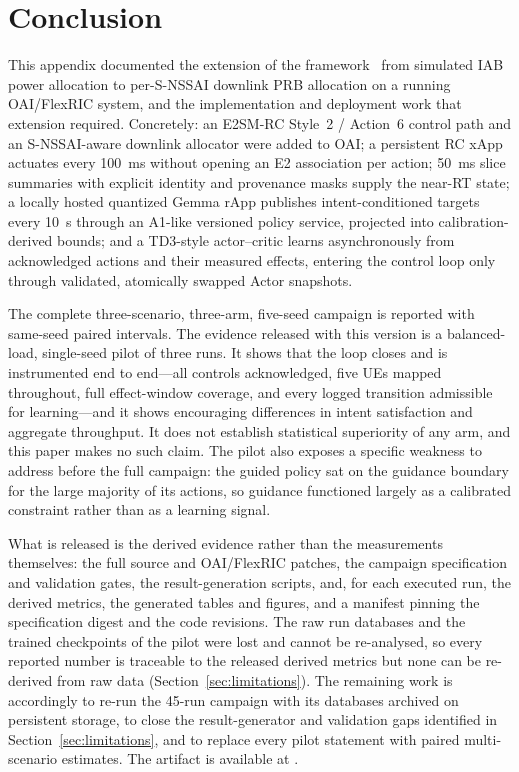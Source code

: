 \section{Conclusion}
This appendix documented the extension of the \systemname{} framework~\cite{bao2026llmhric} from simulated IAB power allocation to per-S-NSSAI downlink PRB allocation on a running OAI/FlexRIC system, and the implementation and deployment work that extension required. Concretely: an E2SM-RC Style~2 / Action~6 control path and an S-NSSAI-aware downlink allocator were added to OAI; a persistent RC xApp actuates every 100~ms without opening an E2 association per action; 50~ms slice summaries with explicit identity and provenance masks supply the near-RT state; a locally hosted quantized Gemma rApp publishes intent-conditioned targets every 10~s through an A1-like versioned policy service, projected into calibration-derived bounds; and a TD3-style actor--critic learns asynchronously from acknowledged actions and their measured effects, entering the control loop only through validated, atomically swapped Actor snapshots.

\ifFullCampaign
The complete three-scenario, three-arm, five-seed campaign is reported with same-seed paired intervals.
\else
The evidence released with this version is a balanced-load, single-seed pilot of three runs. It shows that the loop closes and is instrumented end to end---all controls acknowledged, five UEs mapped throughout, full effect-window coverage, and every logged transition admissible for learning---and it shows encouraging differences in intent satisfaction and aggregate throughput. It does not establish statistical superiority of any arm, and this paper makes no such claim. The pilot also exposes a specific weakness to address before the full campaign: the guided policy sat on the guidance boundary for the large majority of its actions, so guidance functioned largely as a calibrated constraint rather than as a learning signal.
\fi

What is released is the derived evidence rather than the measurements themselves: the full source and OAI/FlexRIC patches, the campaign specification and validation gates, the result-generation scripts, and, for each executed run, the derived metrics, the generated tables and figures, and a manifest pinning the specification digest and the code revisions. The raw run databases and the trained checkpoints of the pilot were lost and cannot be re-analysed, so every reported number is traceable to the released derived metrics but none can be re-derived from raw data (Section~\ref{sec:limitations}). The remaining work is accordingly to re-run the 45-run campaign with its databases archived on persistent storage, to close the result-generator and validation gaps identified in Section~\ref{sec:limitations}, and to replace every pilot statement with paired multi-scenario estimates. The artifact is available at \codeurlprinted.

